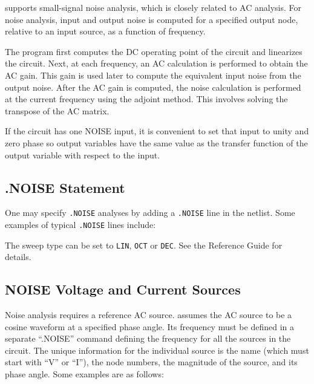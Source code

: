 \Xyce{} supports small-signal noise analysis, which is closely related to
AC analysis. For noise analysis, input and output noise is computed for a specified
output node, relative to an input source, as a function of frequency.  

The program first computes the DC operating point of the circuit and linearizes the circuit.
Next, at each frequency, an AC calculation is performed to obtain the AC gain.
This gain is used later to compute the equivalent input noise from the output noise.
After the AC gain is computed, the noise calculation is performed at the current 
frequency using the adjoint method.  This involves solving the transpose of the
AC matrix.


If the circuit has one NOISE input, it is convenient to set that input to unity
and zero phase so output variables have the same value as the transfer
function of the output variable with respect to the input. 

\subsection{.NOISE Statement}

One may specify \verb|.NOISE| analyses by adding a \verb|.NOISE| line in the netlist.  
Some examples of typical \verb|.NOISE| lines include:


The sweep type can be set to \texttt{LIN}, \texttt{OCT} or \texttt{DEC}.  See the \Xyce{} Reference Guide\ReferenceGuide{} for details.

\subsection{NOISE Voltage and Current Sources}
\label{NOISE_Sources}

Noise analysis requires a reference AC source.
\Xyce{} assumes the AC source to be a cosine waveform at a specified phase
angle. Its frequency must be defined in a separate ``.NOISE'' command defining
the frequency for all the sources in the circuit. The unique information for
the individual source is the name (which must start with ``V'' or ``I''),  the node
numbers, the magnitude of the source, and its phase angle. Some examples are as follows:

